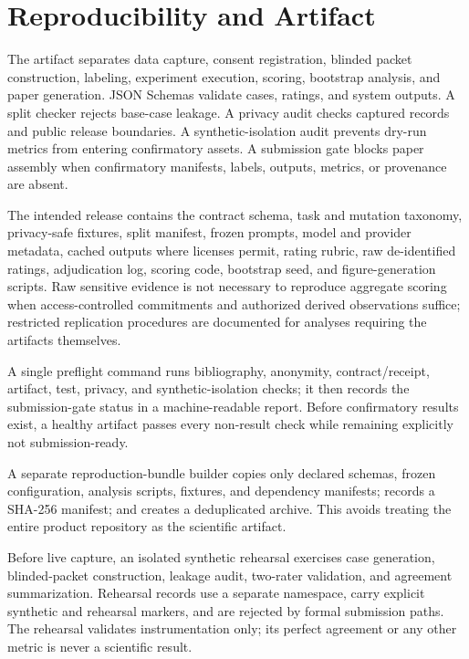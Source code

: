 \documentclass[sigconf,anonymous,review]{acmart}
\begin{document}
\section{Reproducibility and Artifact}
The artifact separates data capture, consent registration, blinded packet construction, labeling, experiment execution, scoring, bootstrap analysis, and paper generation. JSON Schemas validate cases, ratings, and system outputs. A split checker rejects base-case leakage. A privacy audit checks captured records and public release boundaries. A synthetic-isolation audit prevents dry-run metrics from entering confirmatory assets. A submission gate blocks paper assembly when confirmatory manifests, labels, outputs, metrics, or provenance are absent.

The intended release contains the contract schema, task and mutation taxonomy, privacy-safe fixtures, split manifest, frozen prompts, model and provider metadata, cached outputs where licenses permit, rating rubric, raw de-identified ratings, adjudication log, scoring code, bootstrap seed, and figure-generation scripts. Raw sensitive evidence is not necessary to reproduce aggregate scoring when access-controlled commitments and authorized derived observations suffice; restricted replication procedures are documented for analyses requiring the artifacts themselves.

A single preflight command runs bibliography, anonymity, contract/receipt, artifact, test, privacy, and synthetic-isolation checks; it then records the submission-gate status in a machine-readable report. Before confirmatory results exist, a healthy artifact passes every non-result check while remaining explicitly not submission-ready.

A separate reproduction-bundle builder copies only declared schemas, frozen configuration, analysis scripts, fixtures, and dependency manifests; records a SHA-256 manifest; and creates a deduplicated archive. This avoids treating the entire product repository as the scientific artifact.

Before live capture, an isolated synthetic rehearsal exercises case generation, blinded-packet construction, leakage audit, two-rater validation, and agreement summarization. Rehearsal records use a separate namespace, carry explicit synthetic and rehearsal markers, and are rejected by formal submission paths. The rehearsal validates instrumentation only; its perfect agreement or any other metric is never a scientific result.
\end{document}
